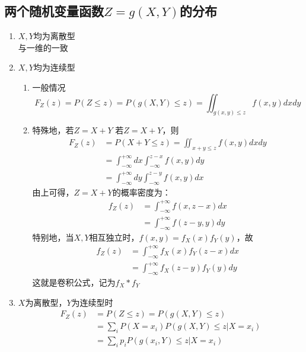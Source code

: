\subsection{两个随机变量函数$Z=g(X,Y)$的分布}
\begin{enumerate}
	\item $X,Y$均为离散型 \\
	与一维的一致
	\item $X,Y$均为连续型 \\ 
	\begin{enumerate}
		\item 一般情况
		\begin{equation}
			F_Z(z) = P(Z \leq z) = P(g(X,Y) \leq z) = \iint_{g(x,y)\leq z} f(x,y)dxdy
		\end{equation}
		\item 特殊地，若$Z=X+Y$
		若$Z=X+Y$，则
		\begin{align}
			F_Z(z) &= P(X+Y\leq z) = \iint_{x+y \leq z} f(x,y)dxdy \\
			&= \int_{-\infty}^{+\infty}dx\int_{-\infty}^{z-x}f(x,y)dy \\
			&= \int_{-\infty}^{+\infty}dy\int_{-\infty}^{z-y}f(x,y)dx
		\end{align}
		由上可得，$Z=X+Y$的概率密度为：
		\begin{align}
			f_Z(z) &= \int_{-\infty}^{+\infty}f(x, z-x)dx \\
			&= \int_{-\infty}^{+\infty}f(z-y, y)dy
		\end{align}
		特别地，当$X, Y$相互独立时，$f(x,y) = f_X(x)f_Y(y)$，故
		\begin{align}
			f_Z(z) &= \int_{-\infty}^{+\infty}f_X(x)f_Y(z-x)dx \\
			&= \int_{-\infty}^{+\infty} f_X(z-y)f_Y(y)dy
		\end{align}
		这就是卷积公式，记为$f_X * f_Y$
	\end{enumerate}
	\item $X$为离散型，$Y$为连续型时
	\begin{align}
		F_Z(z) &= P(Z\leq z) = P(g(X,Y)\leq z) \\
		&= \sum_iP(X=x_i)P(g(X,Y)\leq z|X=x_i) \\
		&= \sum_ip_iP(g(x_i, Y)\leq z | X=x_i)
	\end{align}
\end{enumerate}














